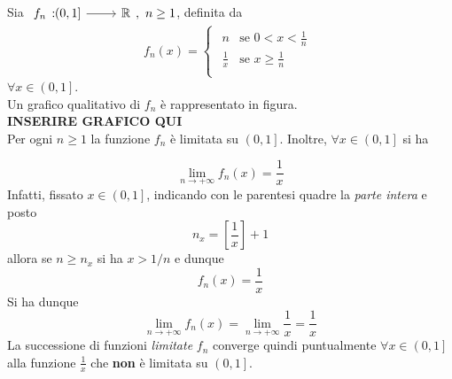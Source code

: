 \begin{example}
	Sia $\funz{f_n}{\left(0,1\right]}{\realset},\ n\geq1$, definita da
	\begin{equation*}
		f_n\left(x\right)=\begin{cases}
			\begin{array}{ll}
				n&\text{se }0<x<\frac{1}{n}\\
				\frac{1}{x}&\text{se }x\geq\frac{1}{n}\\
			\end{array}
		\end{cases}
	\end{equation*}
$\forall x\in \left(0,1\right]$.\\
Un grafico qualitativo di $f_n$ è rappresentato in figura.\\
\textbf{{INSERIRE GRAFICO QUI}}\\ %
Per ogni $n\geq1$ la funzione $f_n$ è limitata su $\left(0,1\right]$. Inoltre, $\forall x\in \left(0,1\right]$ si ha
	
	\begin{equation*}
		\lim_{n\to+\infty}f_n\left(x\right)=\frac{1}{x}
	\end{equation*}
	Infatti, fissato $x\in \left(0,1\right]$, indicando con le parentesi quadre la \textit{parte intera} e posto 
	\begin{equation*}
	n_x=\left[\frac{1}{x}\right]+1
	\end{equation*}
	allora se $n\geq n_x$ si ha $x>1/n$ e dunque
	\begin{equation*}
	f_n\left(x\right)=\frac{1}{x}
	\end{equation*}
	Si ha dunque
	\begin{equation*}
		\lim_{n\to+\infty}f_n\left(x\right)=\lim_{n\to+\infty}\frac{1}{x}=\frac{1}{x}
	\end{equation*}
	La successione di funzioni \textit{limitate} $f_n$ converge quindi puntualmente $\forall x\in \left(0,1\right]$ alla funzione $\frac{1}{x}$ che \textbf{non} è limitata su $\left(0,1\right]$.
\end{example}
